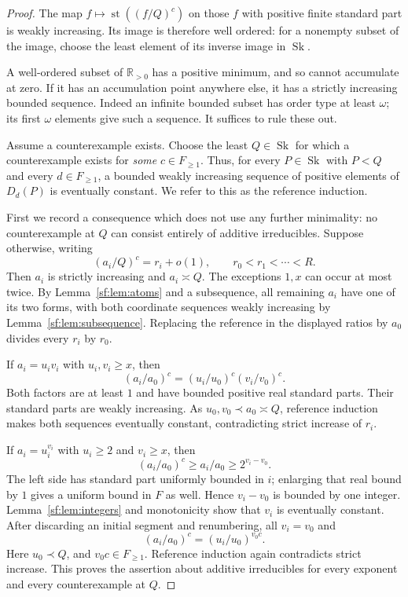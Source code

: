 \documentclass[10pt,a4paper]{amsart}
\newcommand{\R}{\mathbb R}
\newcommand{\Sk}{\operatorname{Sk}}
\newcommand{\arch}{\mathrel{\asymp}}
\newcommand{\st}{\operatorname{st}}
\begin{document}
\begin{proof}
The map $f\mapsto\st((f/Q)^c)$ on those $f$ with positive finite
standard part is weakly increasing. Its image is therefore well
ordered: for a nonempty subset of the image, choose the least
element of its inverse image in $\Sk$.

A well-ordered subset of $\R_{>0}$ has a positive minimum, and so
cannot accumulate at zero. If it has an accumulation point anywhere
else, it has a strictly increasing bounded sequence. Indeed an
infinite bounded subset has order type at least $\omega$; its first
$\omega$ elements give such a sequence. It suffices to rule these out.

Assume a counterexample exists. Choose the least $Q\in\Sk$ for
which a counterexample exists for \emph{some} $c\in F_{\ge1}$.
Thus, for every $P\in\Sk$ with $P<Q$ and every $d\in F_{\ge1}$,
a bounded weakly increasing sequence of positive elements of $D_d(P)$
is eventually constant. We refer to this as the reference induction.

First we record a consequence which does not use any further
minimality: no counterexample at $Q$ can consist entirely of additive
irreducibles. Suppose otherwise, writing
\[
 (a_i/Q)^c=r_i+o(1),\qquad r_0<r_1<\cdots<R.
\]
Then $a_i$ is strictly increasing and $a_i\arch Q$.
The exceptions $1,x$ can occur at most twice. By
Lemma~\ref{sf:lem:atoms} and a subsequence, all remaining $a_i$ have
one of its two forms, with both coordinate sequences weakly
increasing by Lemma~\ref{sf:lem:subsequence}. Replacing the reference
in the displayed ratios by $a_0$ divides every $r_i$ by $r_0$.

If $a_i=u_iv_i$ with $u_i,v_i\ge x$, then
\[
 (a_i/a_0)^c=(u_i/u_0)^c(v_i/v_0)^c.
\]
Both factors are at least $1$ and have bounded positive real standard
parts. Their standard parts are weakly increasing. As
$u_0,v_0\prec a_0\arch Q$, reference induction makes both
sequences eventually constant, contradicting strict increase of $r_i$.

If $a_i=u_i^{v_i}$ with $u_i\ge2$ and $v_i\ge x$, then
\[
 (a_i/a_0)^c\ge a_i/a_0\ge2^{v_i-v_0}.
\]
The left side has standard part uniformly bounded in $i$; enlarging
that real bound by $1$ gives a uniform bound in $F$ as well. Hence
$v_i-v_0$ is bounded by one integer. Lemma~\ref{sf:lem:integers}
and monotonicity show that $v_i$ is eventually constant. After
discarding an initial segment and renumbering, all $v_i=v_0$ and
\[
 (a_i/a_0)^c=(u_i/u_0)^{v_0c}.
\]
Here $u_0\prec Q$, and $v_0c\in F_{\ge1}$. Reference induction
again contradicts strict increase. This proves the assertion about
additive irreducibles for every exponent and every counterexample at $Q$.


\end{proof}
\end{document}
